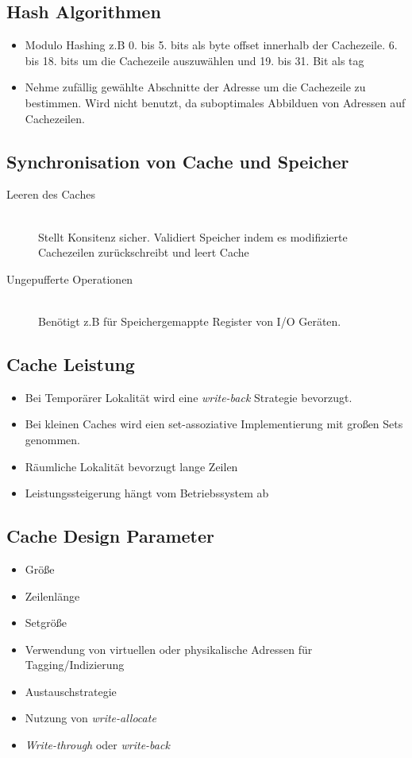 \documentclass[a4paper]{scrreprt}
\begin{document}
\subsection{Hash Algorithmen}
\begin{itemize}
\item Modulo Hashing z.B  0. bis 5. bits als byte offset innerhalb der Cachezeile. 6. bis 18. bits um die Cachezeile auszuwählen und 19. bis 31. Bit als tag
\item Nehme zufällig gewählte Abschnitte der Adresse um die Cachezeile zu bestimmen. Wird nicht benutzt, da suboptimales Abbilduen von Adressen auf Cachezeilen.
\end{itemize}

\subsection{Synchronisation von Cache und Speicher}
\begin{description}
\item[Leeren des Caches] \ \\ Stellt Konsitenz sicher. Validiert Speicher indem es modifizierte Cachezeilen zurückschreibt und leert Cache
\item[Ungepufferte Operationen] \ \\ Benötigt z.B für Speichergemappte Register von I/O Geräten. 
\end{description}
\subsection{Cache Leistung}
\begin{itemize}
\item Bei Temporärer Lokalität wird eine \textit{write-back} Strategie bevorzugt.
\item Bei kleinen Caches  wird eien set-assoziative Implementierung mit großen Sets genommen.
\item Räumliche Lokalität bevorzugt lange Zeilen
\item Leistungssteigerung hängt vom Betriebssystem ab
\end{itemize}

\subsection{Cache Design Parameter}
\begin{itemize}
\item Größe
\item Zeilenlänge
\item Setgröße
\item Verwendung von virtuellen oder physikalische Adressen für Tagging/Indizierung
\item Austauschstrategie
\item Nutzung von \textit{write-allocate}
\item \textit{Write-through} oder \textit{write-back}

\end{itemize}
\end{document}
